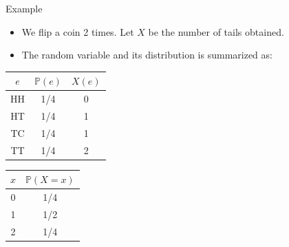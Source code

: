\documentclass[handout]{beamer}
\begin{document}
\begin{frame}{Example}

\begin{itemize}
 \item We flip a coin 2 times. Let $X$ be the number of tails obtained.
 \item The random variable and its distribution is summarized as:
\end{itemize}

\begin{table}
\begin{tabular}{c c|c}
\hline
 $e$ & $\mathbb{P}(e)$ & $X(e)$   \\ 
\hline
HH & 1/4 & 0 \\
HT & 1/4 & 1 \\
TC & 1/4 & 1 \\
TT & 1/4 & 2 \\
\hline
\end{tabular}
\end{table}

\begin{table}
\begin{tabular}{c|c}
\hline
 $x$ & $\mathbb{P}(X = x)$   \\ 
\hline
0 & 1/4 \\
1 & 1/2  \\
2 & 1/4  \\
\hline
\end{tabular}
\end{table}

\end{frame}
\end{document}
